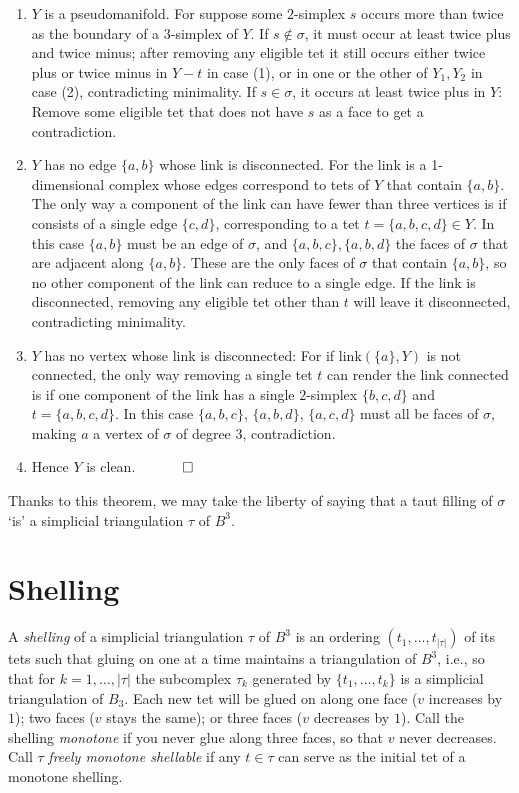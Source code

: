 \documentclass[12pt]{article}
\newcommand{\proofend}{$\quad \qed$}
\newcommand{\kw}{\mathrm}
\newcommand{\link}{\kw{link}}
\begin{document}
\begin{enumerate}

\item
$Y$ is a pseudomanifold.
For suppose some $2$-simplex $s$ occurs more than twice as the boundary
of a $3$-simplex of $Y$.
If $s \notin \sigma$,
it must occur at least twice plus and twice minus;
after removing any eligible tet it
still occurs either twice plus or twice minus in $Y-t$ in case (1),
or in one or the other of $Y_1,Y_2$ in case (2),
contradicting minimality.
If $s \in \sigma$,
it occurs at least twice plus in $Y$:
Remove some eligible tet that does not have $s$ as a face
to get a contradiction.

\item
$Y$ has no edge $\{a,b\}$ whose link
is disconnected.
For the link is a 1-dimensional complex whose edges correspond to
tets of $Y$ that contain $\{a,b\}$.
The only way a component of the link can have fewer than three
vertices is if consists of a single edge $\{c,d\}$, corresponding
to a tet $t=\{a,b,c,d\} \in Y$.
In this case $\{a,b\}$ must be an edge of $\sigma$,
and $\{a,b,c\},\{a,b,d\}$ the faces of $\sigma$
that are adjacent along $\{a,b\}$.
These are the only faces of $\sigma$ that contain $\{a,b\}$,
so no other component of the link can reduce to a single edge.
If the link is disconnected, removing any eligible tet
other than $t$ will
leave it disconnected, contradicting minimality.

\item
$Y$ has no vertex whose link is disconnected:
For if $\link(\{a\},Y)$ is not connected,
the only way removing a single tet $t$
can render the link connected
is if one component of the link has a single $2$-simplex
$\{b,c,d\}$ and $t=\{a,b,c,d\}$.
In this case $\{a,b,c\}$, $\{a,b,d\}$, $\{a,c,d\}$ must
all be faces of $\sigma$,
making $a$ a vertex of $\sigma$ of degree $3$, contradiction.

\item Hence $Y$ is clean.
\proofend

\end{enumerate}

Thanks to this theorem, we may take the liberty of saying that
a taut filling of $\sigma$ `is' a simplicial triangulation
$\tau$ of $B^3$.

\section{Shelling}

A \emph{shelling} of a simplicial triangulation $\tau$ of $B^3$
is an ordering 
$(t_1,\ldots,t_{|\tau|})$
of its tets such that
gluing on one at a time maintains a triangulation of $B^3$,
i.e., 
so that for $k=1,\ldots,|\tau|$ the subcomplex $\tau_k$ generated
by $\{t_1,\ldots,t_k\}$ is a simplicial triangulation of $B_3$.
Each new tet will be glued on along one face ($v$ increases by $1$);
two faces ($v$ stays the same);
or three faces ($v$ decreases by $1$).
Call the shelling \emph{monotone}
if you never glue along three faces, so that $v$ never decreases.
Call $\tau$ \emph{freely monotone shellable} if any $t \in \tau$
can serve as the initial tet of a monotone shelling.
\end{document}
